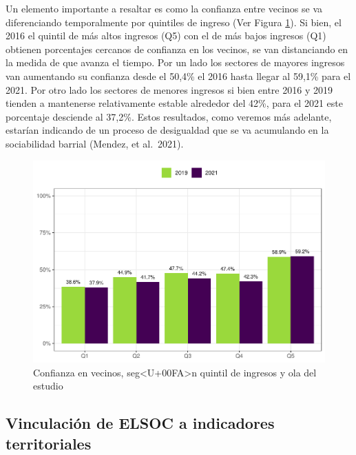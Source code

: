 \documentclass[
  12pt,
]{book}
\begin{document}
Un elemento importante a resaltar es como la confianza entre vecinos se va diferenciando temporalmente por quintiles de ingreso (Ver Figura \ref{fig:vecinos-quintil}). Si bien, el 2016 el quintil de más altos ingresos (Q5) con el de más bajos ingresos (Q1) obtienen porcentajes cercanos de confianza en los vecinos, se van distanciando en la medida de que avanza el tiempo. Por un lado los sectores de mayores ingresos van aumentando su confianza desde el 50,4\% el 2016 hasta llegar al 59,1\% para el 2021. Por otro lado los sectores de menores ingresos si bien entre 2016 y 2019 tienden a mantenerse relativamente estable alrededor del 42\%, para el 2021 este porcentaje desciende al 37,2\%. Estos resultados, como veremos más adelante, estarían indicando de un proceso de desigualdad que se va acumulando en la sociabilidad barrial (Mendez, et al.~2021).

\begin{figure}

{\centering \includegraphics{reporte-elsoc_files/figure-latex/vecinos-quintil-1} 

}

\caption{Confianza en vecinos, seg<U+00FA>n quintil de ingresos y ola del estudio}\label{fig:vecinos-quintil}
\end{figure}

\hypertarget{vinculaciuxf3n-de-elsoc-a-indicadores-territoriales}{%
\subsection*{Vinculación de ELSOC a indicadores territoriales}\label{vinculaciuxf3n-de-elsoc-a-indicadores-territoriales}}
\end{document}

